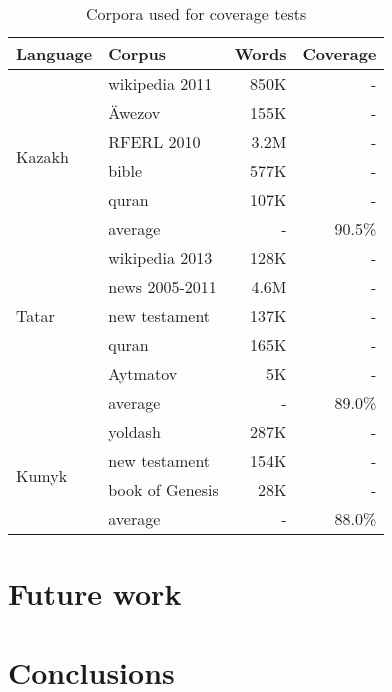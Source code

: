 \documentclass[a4paper,11pt,twocolumn]{article}
\begin{document}
\begin{table}
\begin{center}
\begin{tabular}{llrr}
\toprule
\textbf{Language} & \textbf{Corpus} & \textbf{Words} & \textbf{Coverage} \\
\midrule
\multirow{6}{*}{Kazakh} & wikipedia 2011& 850K &  - \\
	& Äwezov & 155K & - \\
	& RFERL 2010 & 3.2M & - \\
	& bible & 577K & - \\
	& quran & 107K & - \\\cline{2-4}
	& average & - & 90.5\% \\
\midrule
\multirow{5}{*}{Tatar} & wikipedia 2013 & 128K &  - \\
	& news 2005-2011 & 4.6M & - \\
	& new testament & 137K & - \\
	& quran & 165K & - \\
	& Aytmatov & 5K & - \\\cline{2-4}
	& average & - & 89.0\% \\
\midrule
\multirow{4}{*}{Kumyk} & yoldash & 287K &  - \\
	& new testament & 154K & - \\
	& book of Genesis & 28K & - \\\cline{2-4}
	& average & - & 88.0\% \\
\bottomrule
\end{tabular}
 \caption{Corpora used for coverage tests}
 \label{table:corpora}
\end{center}
\end{table}



\section{Future work}


\section{Conclusions}




\end{document}
